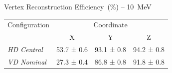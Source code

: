 \centering
Vertex Reconstruction Efficiency~(\%) -- \SI{10}{\mega\electronvolt}\\
\begin{tabular}{lccc}
\toprule
Configuration & \multicolumn{3}{c}{Coordinate} \\
 & X & Y & Z \\
\midrule
\emph{HD Central} & 53.7 ± 0.6 & 93.1 ± 0.8 & 94.2 ± 0.8 \\
\emph{VD Nominal} & 27.3 ± 0.4 & 86.8 ± 0.8 & 91.8 ± 0.8 \\
\bottomrule
\end{tabular}
